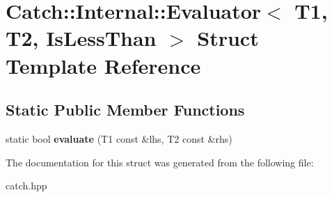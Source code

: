 \hypertarget{structCatch_1_1Internal_1_1Evaluator_3_01T1_00_01T2_00_01IsLessThan_01_4}{}\section{Catch\+:\+:Internal\+:\+:Evaluator$<$ T1, T2, Is\+Less\+Than $>$ Struct Template Reference}
\label{structCatch_1_1Internal_1_1Evaluator_3_01T1_00_01T2_00_01IsLessThan_01_4}
\subsection*{Static Public Member Functions}
\begin{DoxyCompactItemize}
\item 
static bool {\bfseries evaluate} (T1 const \&lhs, T2 const \&rhs)\hypertarget{structCatch_1_1Internal_1_1Evaluator_3_01T1_00_01T2_00_01IsLessThan_01_4_a75b2bcf80ce6f90218c145e2c3293d75}{}\label{structCatch_1_1Internal_1_1Evaluator_3_01T1_00_01T2_00_01IsLessThan_01_4_a75b2bcf80ce6f90218c145e2c3293d75}

\end{DoxyCompactItemize}


The documentation for this struct was generated from the following file\+:\begin{DoxyCompactItemize}
\item 
catch.\+hpp\end{DoxyCompactItemize}
